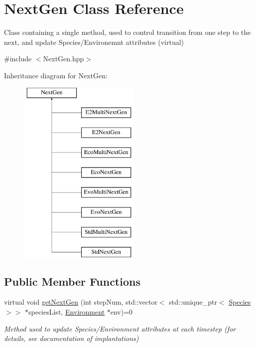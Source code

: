 \hypertarget{classNextGen}{}\section{Next\+Gen Class Reference}
\label{classNextGen}


Class containing a single method, used to control transition from one step to the next, and update Species/\+Environemnt attributes (virtual)  




{\ttfamily \#include $<$Next\+Gen.\+hpp$>$}

Inheritance diagram for Next\+Gen\+:\begin{figure}[H]
\begin{center}
\leavevmode
\includegraphics[height=9.000000cm]{classNextGen}
\end{center}
\end{figure}
\subsection*{Public Member Functions}
\begin{DoxyCompactItemize}
\item 
virtual void \hyperlink{classNextGen_aa70da77e0ac03da1bd5414c5e3fd70c0}{get\+Next\+Gen} (int step\+Num, std\+::vector$<$ std\+::unique\+\_\+ptr$<$ \hyperlink{classSpecies}{Species} $>$$>$ $\ast$species\+List, \hyperlink{classEnvironment}{Environment} $\ast$env)=0
\begin{DoxyCompactList}\small\item\em Method used to update Species/\+Environment attributes at each timestep (for details, see documentation of implantations) \end{DoxyCompactList}\end{DoxyCompactItemize}


